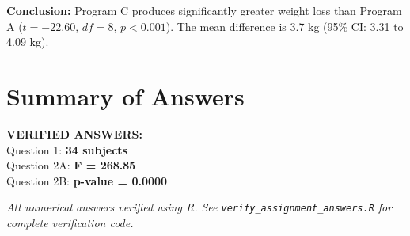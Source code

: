 \documentclass[11pt]{article}
\begin{document}
\vspace{0.3cm}

\textbf{Conclusion:} Program C produces significantly greater weight loss than Program A ($t = -22.60$, $df = 8$, $p < 0.001$). The mean difference is 3.7 kg (95\% CI: 3.31 to 4.09 kg).

\vspace{1cm}

\section*{Summary of Answers}

\begin{center}
\begin{tcolorbox}[colback=answergreen!10,colframe=answergreen,boxrule=1pt,arc=3pt,left=6pt,right=6pt,top=8pt,bottom=8pt]
\textbf{VERIFIED ANSWERS:}\\[0.3cm]
Question 1: \textbf{34 subjects}\\
Question 2A: \textbf{F = 268.85}\\
Question 2B: \textbf{p-value = 0.0000}
\end{tcolorbox}
\end{center}

\vspace{0.5cm}

\noindent\textit{All numerical answers verified using R. See \texttt{verify\_assignment\_answers.R} for complete verification code.}
\end{document}
